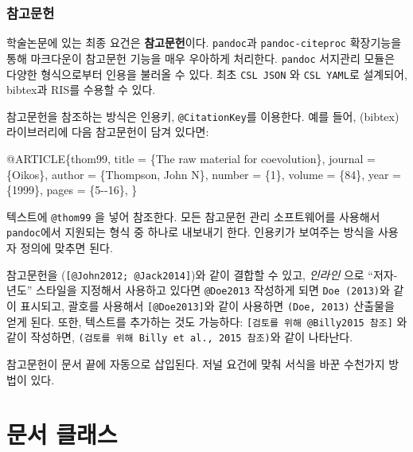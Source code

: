 \documentclass[
  letterpaper,
]{book}
\newenvironment{Shaded}{\begin{snugshade}}{\end{snugshade}}
\newcommand{\AttributeTok}[1]{\textcolor[rgb]{0.40,0.45,0.13}{#1}}
\begin{document}
\hypertarget{uxcc38uxace0uxbb38uxd5cc-1}{%
\subsection{참고문헌}\label{uxcc38uxace0uxbb38uxd5cc-1}}

학술논문에 있는 최종 요건은 \textbf{참고문헌}이다. \texttt{pandoc}과
\texttt{pandoc-citeproc} 확장기능을 통해 마크다운이 참고문헌 기능을 매우
우아하게 처리한다. \texttt{pandoc} 서지관리 모듈은 다양한 형식으로부터
인용을 불러올 수 있다. 최초 \texttt{CSL\ JSON} 와 \texttt{CSL\ YAML}로
설계되어, bibtex과 RIS를 수용할 수 있다.

참고문헌을 참조하는 방식은 인용키, \texttt{@CitationKey}를 이용한다.
예를 들어, (bibtex) 라이브러리에 다음 참고문헌이 담겨 있다면:

\begin{Shaded}
\begin{Highlighting}[]
\AttributeTok{@ARTICLE\{thom99,}
\AttributeTok{    title = \{The raw material for coevolution\},}
\AttributeTok{    journal = \{Oikos\},}
\AttributeTok{    author = \{Thompson, John N\},}
\AttributeTok{    number = \{1\},}
\AttributeTok{    volume = \{84\},}
\AttributeTok{    year = \{1999\},}
\AttributeTok{    pages = \{5{-}{-}16\},}
\AttributeTok{\}}
\end{Highlighting}
\end{Shaded}

텍스트에 \texttt{@thom99} 을 넣어 참조한다. 모든 참고문헌 관리
소프트웨어를 사용해서 \texttt{pandoc}에서 지원되는 형식 중 하나로
내보내기 한다. 인용키가 보여주는 방식을 사용자 정의에 맞추면 된다.

참고문헌을 (\texttt{{[}@John2012;\ @Jack2014{]}})와 같이 결합할 수 있고,
\emph{인라인} 으로 ``저자-년도'' 스타일을 지정해서 사용하고 있다면
\texttt{@Doe2013} 작성하게 되면 \texttt{Doe\ (2013)}와 같이 표시되고,
괄호를 사용해서 \texttt{{[}@Doe2013{]}}와 같이 사용하면
\texttt{(Doe,\ 2013)} 산출물을 얻게 된다. 또한, 텍스트를 추가하는 것도
가능하다: \texttt{{[}검토를\ 위해\ @Billy2015\ 참조{]}} 와 같이
작성하면, \texttt{(검토를\ 위해\ Billy\ et\ al.,\ 2015\ 참조)}와 같이
나타난다.

참고문헌이 문서 끝에 자동으로 삽입된다. 저널 요건에 맞춰 서식을 바꾼
수천가지 방법이 있다.

\hypertarget{uxbb38uxc11c-uxd074uxb798uxc2a4}{%
\chapter{문서 클래스}\label{uxbb38uxc11c-uxd074uxb798uxc2a4}}
\end{document}
